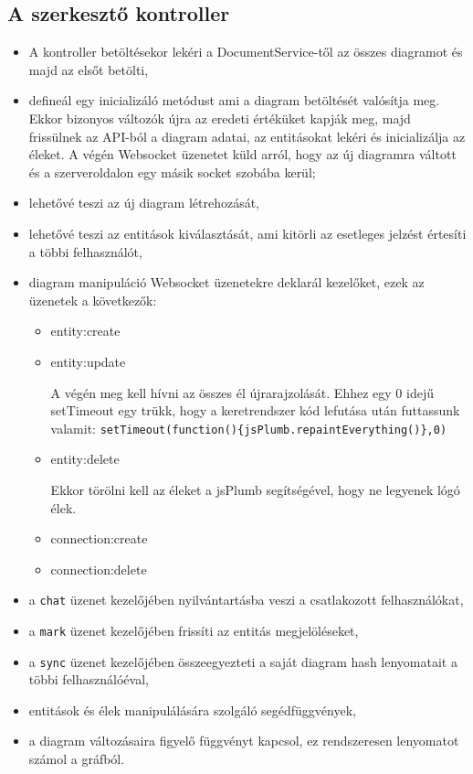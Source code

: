 \subsection{A szerkesztő kontroller}

\begin{itemize}
\item A kontroller betöltésekor lekéri a DocumentService-től az összes diagramot és majd az elsőt betölti,
\item defineál egy inicializáló metódust ami a diagram betöltését valósítja meg. Ekkor bizonyos változók újra az eredeti értéküket kapják meg, majd frissülnek az API-ból a diagram adatai, az entitásokat lekéri és inicializálja az éleket. A végén Websocket üzenetet küld arról, hogy az új diagramra váltott és a szerveroldalon egy másik socket szobába kerül;
\item lehetővé teszi az új diagram létrehozását,
\item lehetővé teszi az entitások kiválasztását, ami kitörli az esetleges jelzést értesíti a többi felhasználót,
\item diagram manipuláció Websocket üzenetekre deklarál kezelőket, ezek az üzenetek a következők:
\begin{itemize}
\item entity:create
\item entity:update

A végén meg kell hívni az összes él újrarajzolását. Ehhez egy 0 idejű setTimeout egy trükk, hogy a keretrendszer kód lefutása után futtassunk valamit: \lstinline|setTimeout(function(){jsPlumb.repaintEverything()},0)|

\item entity:delete

Ekkor törölni kell az éleket a jsPlumb segítségével, hogy ne legyenek lógó élek.

\item connection:create
\item connection:delete

\end{itemize}

\item a \lstinline{chat} üzenet kezelőjében nyilvántartásba veszi a csatlakozott felhasználókat,
\item a \lstinline{mark} üzenet kezelőjében frissíti az entitás megjelöléseket,
\item a \lstinline{sync} üzenet kezelőjében összeegyezteti a saját diagram hash lenyomatait a többi felhasználóéval,
\item entitások és élek manipulálására szolgáló segédfüggvények,
\item a diagram változásaira figyelő függvényt kapcsol, ez rendszeresen lenyomatot számol a gráfból.

\end{itemize}



